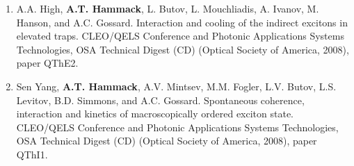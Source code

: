 {\begin{enumerate}[resume]
{        CLEO/IQE Conference, OSA Technical Digest (CD) (Optical Society of America, 2009), paper IThE5.
        }
        \item {
        A.A. High, \textbf{A.T. Hammack}, L. Butov, L. Mouchliadis, A. Ivanov, M. Hanson, and A.C. Gossard. 
        Interaction and cooling of the indirect excitons in elevated traps.
        CLEO/QELS Conference and Photonic Applications Systems Technologies, OSA Technical Digest (CD) (Optical Society of America, 2008), paper QThE2.
        }
        \item {
        Sen Yang, \textbf{A.T. Hammack}, A.V. Mintsev, M.M. Fogler, L.V. Butov, L.S. Levitov, B.D. Simmons, and A.C. Gossard.
        Spontaneous coherence, interaction and kinetics of macroscopically ordered exciton state.
        CLEO/QELS Conference and Photonic Applications Systems Technologies, OSA Technical Digest (CD) (Optical Society of America, 2008), paper QThI1. 
        \setcounter{pubs}{\value{enumi}}
        }
    \end{enumerate}
}